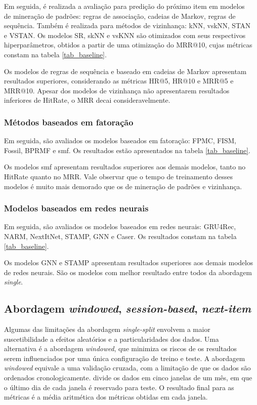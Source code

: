 Em seguida, é realizada a avaliação para predição do próximo item em modelos de
mineração de padrões: regras de associação, cadeias de Markov, regras de
sequência. Também é realizada para métodos de vizinhança: kNN, vskNN, STAN e
VSTAN. Os modelos SR, skNN e vsKNN são otimizados com seus respectivos
hiperparâmetros, obtidos a partir de uma otimização do MRR@10, cujas
métricas constam na tabela \ref{tab_baseline}.

Os modelos de regras de sequência e baseado em cadeias de Markov apresentam
resultados superiores, considerando as métricas HR@5, HR@10 e MRR@5 e MRR@10.
Apesar dos modelos de vizinhança não apresentarem resultados inferiores de HitRate,
o MRR decai consideravelmente.

\subsubsection{Métodos baseados em fatoração}
Em seguida, são avaliados os modelos baseados em fatoração: FPMC, FISM, Fossil,
BPRMF e smf. Os resultados estão apresentados na tabela \ref{tab_baseline}.

Os modelos smf apresentam resultados superiores aos demais modelos, tanto no
HitRate quanto no MRR. Vale observar que o tempo de treinamento desses modelos é
muito mais demorado que os de mineração de padrões e vizinhança.

\subsubsection{Modelos baseados em redes neurais}
Em seguida, são avaliados os modelos baseados em redes neurais: GRU4Rec, NARM,
NextItNet, STAMP, GNN e Caser. Os resultados constam na tabela \ref{tab_baseline}.

Os modelos GNN e STAMP apresentam resultados superiores aos demais modelos de
redes neurais. São os modelos com melhor resultado entre todos da abordagem
\textit{single}.


\subsection{Abordagem \textit{windowed}, \textit{session-based}, \textit{next-item}}
Algumas das limitações da abordagem \textit{single-split} envolvem a maior
suscetibilidade a efeitos aleatórios e a particularidades dos dados. Uma
alternativa é a abordagem \textit{windowed}, que minimiza os riscos de os
resultados serem influenciados por uma única configuração de treino e teste. A
abordagem \textit{windowed} equivale a uma validação cruzada, com a limitação de
que os dados são ordenados cronologicamente. \citet{ludewig_2018} divide os
dados em cinco janelas de um mês, em que o último dia de cada janela é reservado
para teste. O resultado final para as métricas é a média aritmética dos
métricas obtidas em cada janela.


